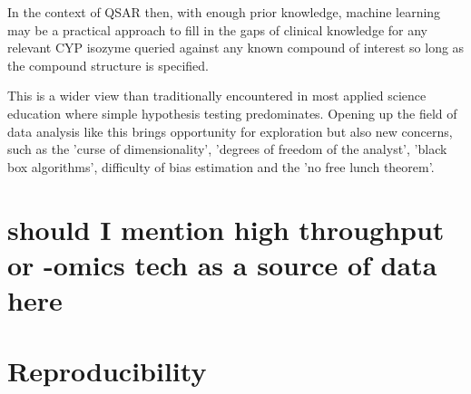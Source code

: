 In the context of QSAR then, with enough prior knowledge, machine learning may be a practical approach to fill in the gaps of clinical knowledge for any relevant CYP isozyme queried against any known compound of interest so long as the compound structure is specified.

This is a wider view than traditionally encountered in most applied science education where simple hypothesis testing predominates. Opening up the field of data analysis like this brings opportunity for exploration but also new concerns, such as the 'curse of dimensionality', 'degrees of freedom of the analyst', 'black box algorithms', difficulty of bias estimation and the 'no free lunch theorem'.\cite{Boulesteix2014}








\section{should I mention high throughput or -omics tech as a source of data here}

\section{Reproducibility}

